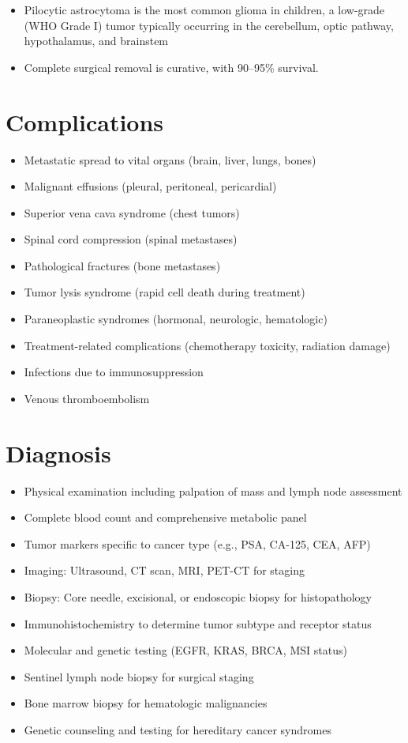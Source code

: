 \begin{itemize}[noitemsep]
  \item Pilocytic astrocytoma is the most common glioma in children, a low-grade (WHO Grade I) tumor typically occurring in the cerebellum, optic pathway, hypothalamus, and brainstem
  \item Complete surgical removal is curative, with 90--95\% survival.
\end{itemize}
\section{Complications}
\begin{itemize}[noitemsep]
  \item Metastatic spread to vital organs (brain, liver, lungs, bones)
  \item Malignant effusions (pleural, peritoneal, pericardial)
  \item Superior vena cava syndrome (chest tumors)
  \item Spinal cord compression (spinal metastases)
  \item Pathological fractures (bone metastases)
  \item Tumor lysis syndrome (rapid cell death during treatment)
  \item Paraneoplastic syndromes (hormonal, neurologic, hematologic)
  \item Treatment-related complications (chemotherapy toxicity, radiation damage)
  \item Infections due to immunosuppression
  \item Venous thromboembolism
\end{itemize}
\section{Diagnosis}
\begin{itemize}[noitemsep]
  \item Physical examination including palpation of mass and lymph node assessment
  \item Complete blood count and comprehensive metabolic panel
  \item Tumor markers specific to cancer type (e.g., PSA, CA-125, CEA, AFP)
  \item Imaging: Ultrasound, CT scan, MRI, PET-CT for staging
  \item Biopsy: Core needle, excisional, or endoscopic biopsy for histopathology
  \item Immunohistochemistry to determine tumor subtype and receptor status
  \item Molecular and genetic testing (EGFR, KRAS, BRCA, MSI status)
  \item Sentinel lymph node biopsy for surgical staging
  \item Bone marrow biopsy for hematologic malignancies
  \item Genetic counseling and testing for hereditary cancer syndromes
\end{itemize}
